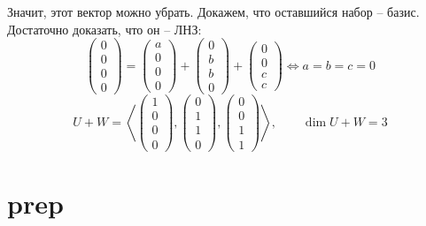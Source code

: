 Значит, этот вектор можно убрать. Докажем, что оставшийся набор -- базис. Достаточно доказать, что он -- ЛНЗ:
$$
\begin{pmatrix}
	0 \\
    0 \\
    0 \\
    0
\end{pmatrix} =
\begin{pmatrix}
	a \\
    0 \\
    0 \\
    0
\end{pmatrix} +
\begin{pmatrix}
	0 \\
    b \\
    b \\
    0
\end{pmatrix} +
\begin{pmatrix}
	0 \\
    0 \\
    c \\
    c
\end{pmatrix} \iff a = b = c = 0 $$
$$ U + W = \left\langle
\begin{pmatrix}
	1 \\
    0 \\
    0 \\
    0
\end{pmatrix},
\begin{pmatrix}
	0 \\
    1 \\
    1 \\
    0
\end{pmatrix},
\begin{pmatrix}
	0 \\
    0 \\
    1 \\
    1
\end{pmatrix} \right\rangle, \qquad \dim U + W = 3 $$

\section{prep}

